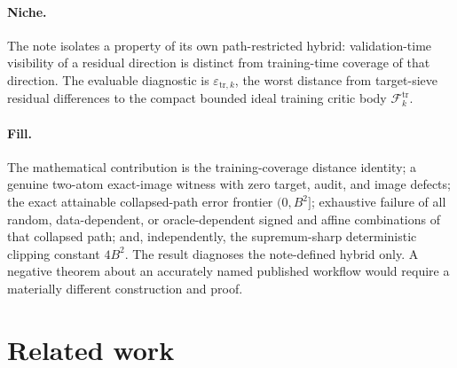\documentclass{article}
\begin{document}
\paragraph{Niche.} The note isolates a property of its own path-restricted hybrid: validation-time visibility of a residual direction is distinct from training-time coverage of that direction. The evaluable diagnostic is \(\varepsilon_{\mathrm{tr},k}\), the worst distance from target-sieve residual differences to the compact bounded ideal training critic body \(\mathcal F_k^{\mathrm{tr}}\).

\paragraph{Fill.} The mathematical contribution is the training-coverage distance identity; a genuine two-atom exact-image witness with zero target, audit, and image defects; the exact attainable collapsed-path error frontier \((0,B^2]\); exhaustive failure of all random, data-dependent, or oracle-dependent signed and affine combinations of that collapsed path; and, independently, the supremum-sharp deterministic clipping constant \(4B^2\). The result diagnoses the note-defined hybrid only. A negative theorem about an accurately named published workflow would require a materially different construction and proof.

\section{Related work}
\end{document}
